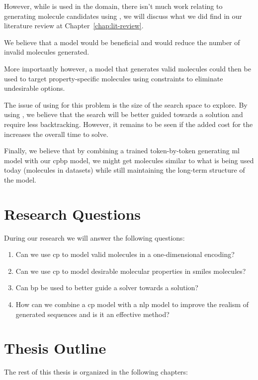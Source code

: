 \documentclass[../Document.tex]{subfiles}
\begin{document}
However, while \cp is used in the domain, there isn't much work relating to generating molecule candidates using \cp, we will discuss what we did find in our literature review at Chapter~\ref{chap:lit-review}.

We believe that a \cp model would be beneficial and would reduce the number of invalid molecules generated.

More importantly however, a \cp model that generates valid molecules could then be used to target property-specific molecules using constraints to eliminate undesirable options.

The issue of using \cp for this problem is the size of the search space to explore. By using \bp, we believe that the search will be better guided towards a solution and require less backtracking. However, it remains to be seen if the added cost for the \bp increases the overall time to solve.

Finally, we believe that by combining a trained token-by-token generating \gls{ml} model with our \gls{cpbp} model, we might get molecules similar to what is being used today (molecules in datasets) while still maintaining the long-term structure of the \cp model.


\section{Research Questions}
\label{sec:intro/questions}
During our research we will answer the following questions:

\begin{enumerate}
    \item Can we use \acrshort{cp} to model valid molecules in a one-dimensional encoding?
    \item Can we use \acrshort{cp} to model desirable molecular properties in \acrshort{smiles} molecules?
    \item Can \acrlong{bp} be used to better guide a solver towards a solution?
    \item How can we combine a \acrshort{cp} model with a \acrshort{nlp} model to improve the realism of generated sequences and is it an effective method?
\end{enumerate}

\section{Thesis Outline}
\label{sec:intro/outline}
The rest of this thesis is organized in the following chapters:
\end{document}
